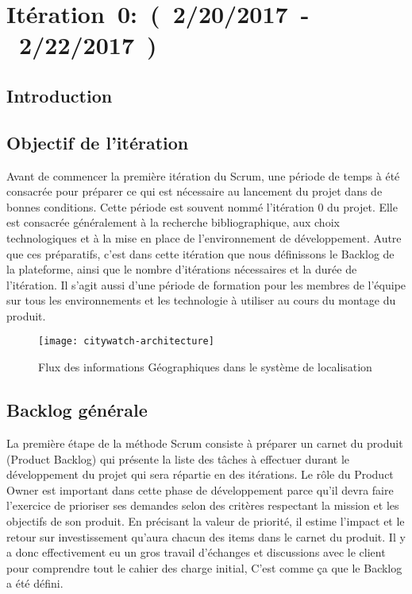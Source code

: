 \section{Itération~0:~(~2/20/2017~-~2/22/2017~)}

\subsection*{Introduction}

\subsection{Objectif de l'itération}

Avant de commencer la première itération du Scrum, une période de temps à été
consacrée pour préparer ce qui est nécessaire au lancement du projet dans de
bonnes conditions. Cette période est souvent nommé l'itération 0 du projet.
Elle est consacrée généralement à la recherche bibliographique, aux choix
technologiques et à la mise en place de l'environnement de développement. Autre
que ces préparatifs, c'est dans cette itération que nous définissons le Backlog
de la plateforme, ainsi que le nombre d'itérations nécessaires et la durée de
l'itération. Il s'agit aussi d'une période de formation pour les membres de
l'équipe sur tous les environnements et les technologie à utiliser au cours du
montage du produit.

\begin{figure}[htbp]
  \centering
  \texttt{[image: citywatch-architecture]}
  \caption[Flux des information Géographiques en CityWatch]
  {Flux des informations Géographiques dans le système de localisation}
  \label{fig:citywatch-architecture}
\end{figure}

\subsection{Backlog générale}

La première étape de la méthode Scrum consiste à préparer un carnet du produit
(Product Backlog) qui présente la liste des tâches à effectuer durant le
développement du projet qui sera répartie en des itérations. Le rôle du
Product Owner est important dans cette phase de développement parce qu'il devra
faire l'exercice de prioriser ses demandes selon des critères respectant la
mission et les objectifs de son produit. En précisant la valeur de priorité, il
estime l'impact et le retour sur investissement qu'aura chacun des items dans
le carnet du produit. Il y a donc effectivement eu un gros travail d'échanges
et discussions avec le client pour comprendre tout le cahier des charge
initial, C'est comme ça que le Backlog a été défini.

